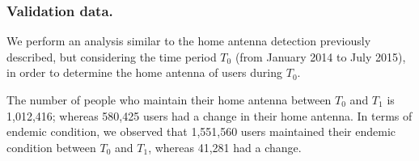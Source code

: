 \subsubsection{Validation data.} %

We perform an analysis similar to the home antenna detection previously described, 
but considering the time period $T_0$ (from January 2014 to July 2015),
in order to determine the home antenna of users during $T_0$.

The number of people who maintain their home antenna between $T_0$ and $T_1$ is 1,012,416;
whereas 580,425 users had a change in their home antenna.
In terms of endemic condition, we observed that 1,551,560 users maintained their endemic condition
between $T_0$ and $T_1$, whereas 41,281 had a change.



%
%
%

%
%


